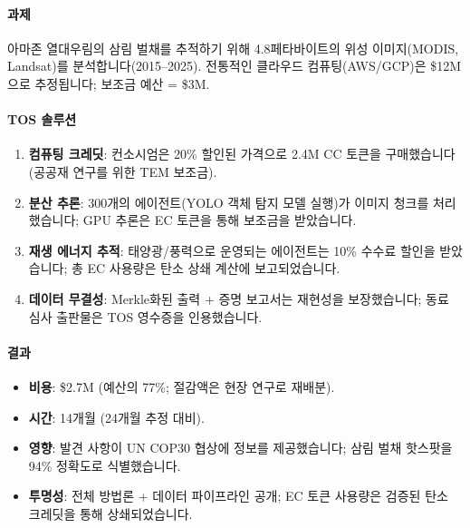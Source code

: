 \documentclass[11pt]{article}
\begin{document}
\paragraph{과제} 아마존 열대우림의 삼림 벌채를 추적하기 위해 4.8페타바이트의 위성 이미지(MODIS, Landsat)를 분석합니다(2015--2025). 전통적인 클라우드 컴퓨팅(AWS/GCP)은 \$12M으로 추정됩니다; 보조금 예산 = \$3M.

\paragraph{TOS 솔루션}
\begin{enumerate}[noitemsep]
  \item \textbf{컴퓨팅 크레딧}: 컨소시엄은 20\% 할인된 가격으로 2.4M CC 토큰을 구매했습니다(공공재 연구를 위한 TEM 보조금).
  \item \textbf{분산 추론}: 300개의 에이전트(YOLO 객체 탐지 모델 실행)가 이미지 청크를 처리했습니다; GPU 추론은 EC 토큰을 통해 보조금을 받았습니다.
  \item \textbf{재생 에너지 추적}: 태양광/풍력으로 운영되는 에이전트는 10\% 수수료 할인을 받았습니다; 총 EC 사용량은 탄소 상쇄 계산에 보고되었습니다.
  \item \textbf{데이터 무결성}: Merkle화된 출력 + 증명 보고서는 재현성을 보장했습니다; 동료 심사 출판물은 TOS 영수증을 인용했습니다.
\end{enumerate}

\paragraph{결과}
\begin{itemize}[noitemsep]
  \item \textbf{비용}: \$2.7M (예산의 77\%; 절감액은 현장 연구로 재배분).
  \item \textbf{시간}: 14개월 (24개월 추정 대비).
  \item \textbf{영향}: 발견 사항이 UN COP30 협상에 정보를 제공했습니다; 삼림 벌채 핫스팟을 94\% 정확도로 식별했습니다.
  \item \textbf{투명성}: 전체 방법론 + 데이터 파이프라인 공개; EC 토큰 사용량은 검증된 탄소 크레딧을 통해 상쇄되었습니다.
\end{itemize}
\end{document}
